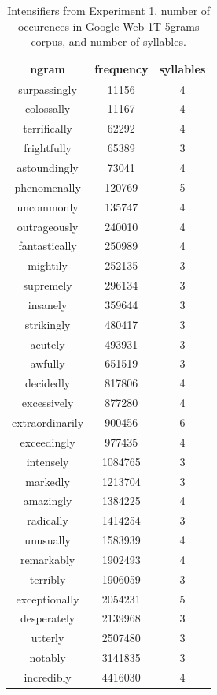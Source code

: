 \documentclass[10pt,letterpaper]{article}
\begin{document}
\begin{table}[ht]
 \begin{center}
 \footnotesize
  \caption{Intensifiers from Experiment 1, number of occurences in Google Web 1T 5grams corpus, and number of syllables.}
  \label{exp1-intensifiers}
  \begin{tabular}{ccc}
   \hline
   ngram & frequency & syllables \\
    \hline
    surpassingly & 11156 & 4 \\
    colossally & 11167 & 4 \\
    terrifically & 62292 & 4 \\
    frightfully & 65389 & 3 \\
    astoundingly & 73041 & 4 \\
    phenomenally & 120769 & 5 \\
    uncommonly & 135747 & 4 \\
    outrageously & 240010 & 4 \\
    fantastically & 250989 & 4 \\
    mightily & 252135 & 3 \\
    supremely & 296134 & 3 \\
    insanely & 359644 & 3 \\
    strikingly & 480417 & 3 \\
    acutely & 493931 & 3 \\
    awfully & 651519 & 3 \\
    decidedly & 817806 & 4 \\
    excessively & 877280 & 4 \\
    extraordinarily & 900456 & 6 \\
    exceedingly & 977435 & 4 \\
    intensely & 1084765 & 3 \\
    markedly & 1213704 & 3 \\
    amazingly & 1384225 & 4 \\
    radically & 1414254 & 3 \\
    unusually & 1583939 & 4 \\
    remarkably & 1902493 & 4 \\
    terribly & 1906059 & 3 \\
    exceptionally & 2054231 & 5 \\
    desperately & 2139968 & 3 \\
    utterly & 2507480 & 3 \\
    notably & 3141835 & 3 \\
    incredibly & 4416030 & 4 \\

\end{tabular}
\end{center}
\end{table}
\end{document}
